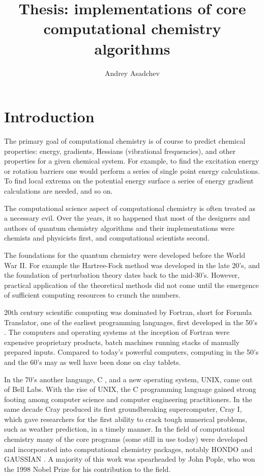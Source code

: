 \documentclass[12pt]{book} \usepackage[margin=1in]{geometry}
\begin{document}
\doublespacing

\title{Thesis: implementations of core computational chemistry
algorithms} \author{Andrey Asadchev} \date{}

\maketitle

\tableofcontents


\chapter{Introduction} The primary goal of computational chemistry is
of course to predict chemical properties: energy, gradients, Hessians
(vibrational frequencies), and other properties for a given chemical
system.  For example, to find the excitation energy or rotation
barriers one would perform a series of single point energy
calculations.  To find local extrema on the potential energy
surface a series of energy gradient calculations are needed, and so
on.

The computational science aspect of computational chemistry is often
treated as a necessary evil.  Over the years, it so happened that most
of the designers and authors of quantum chemistry algorithms and their
implementations were chemists and physicists first, and computational
scientists second.

The foundations for the quantum chemistry were developed before the
World War II. For example the Hartree-Fock \cite{hartree,fock} method
was developed in the late 20's, and the foundation of perturbation
theory \cite{moller1934note} dates back to the mid-30's.  However,
practical application of the theoretical methods did not come until
the emergence of sufficient computing resources to crunch the numbers.

20th century scientific computing was dominated by Fortran, short for
Formula Translator, one of the earliest programming languages, first
developed in the 50's \cite {fortran}.  The computers and operating
systems at the inception of Fortran were expensive proprietary
products, batch machines running stacks of manually prepared inputs.
Compared to today's powerful computers, computing in the 50's and the
60's may as well have been done on clay tablets.

In the 70's another language, C \cite{c}, and a new operating system,
UNIX, came out of Bell Labs.  With the rise of UNIX, the C programming
language gained strong footing among computer science and computer
engineering practitioners.  In the same decade Cray produced its first
groundbreaking supercomputer, Cray I, which gave researchers for the
first ability to crack tough numerical problems, such as weather
prediction, in a timely manner.  In the field of computational
chemistry many of the core programs (some still in use today) were
developed and incorporated into computational chemistry packages,
notably HONDO \cite{hondo} and GAUSSIAN \cite{gaussian}.  A majority
of this work was spearheaded by John Pople, who won the 1998 Nobel
Prize for his contribution to the field.
\end{document}
